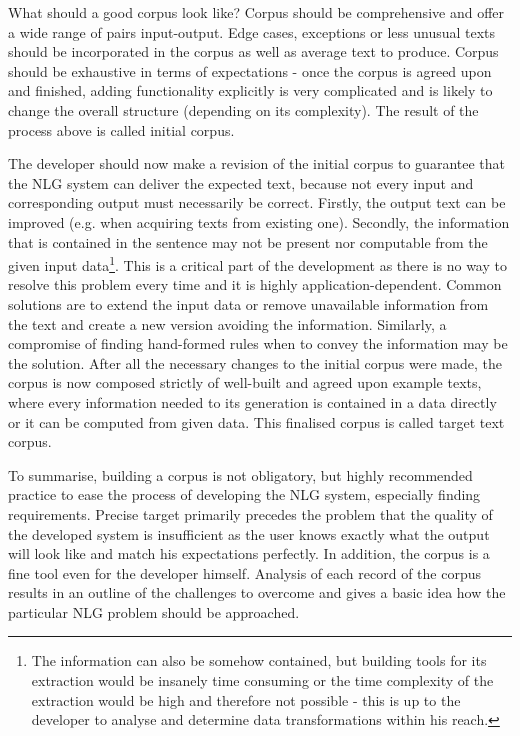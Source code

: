 What should a good corpus look like? Corpus should be comprehensive and offer a wide range of pairs input-output. Edge cases, exceptions or less unusual texts should be incorporated in the corpus as well as average text to produce. Corpus should be exhaustive in terms of expectations - once the corpus is agreed upon and finished, adding functionality explicitly is very complicated and is likely to change the overall structure (depending on its complexity). The result of the process above is called initial corpus.

The developer should now make a revision of the initial corpus to guarantee that the NLG system can deliver the expected text, because not every input and corresponding output must necessarily be correct. Firstly, the output text can be improved (e.g. when acquiring texts from existing one). Secondly, the information that is contained in the sentence may not be present nor computable from the given input data\footnote{The information can also be somehow contained, but building tools for its extraction would be insanely time consuming or the time complexity of the extraction would be high and therefore not possible - this is up to the developer to analyse and determine data transformations within his reach.}. This is a critical part of the development as there is no way to resolve this problem every time and it is highly application-dependent. Common solutions are to extend the input data or remove unavailable information from the text and create a new version avoiding the information. Similarly, a compromise of finding hand-formed rules when to convey the information may be the solution. After all the necessary changes to the initial corpus were made, the corpus is now composed strictly of well-built and agreed upon example texts, where every information needed to its generation is contained in a data directly or it can be computed from given data. This finalised corpus is called target text corpus.

To summarise, building a corpus is not obligatory, but highly recommended practice to ease the process of developing the NLG system, especially finding requirements. Precise target primarily precedes the problem that the quality of the developed system is insufficient as the user knows exactly what the output will look like and match his expectations perfectly. In addition, the corpus is a fine tool even for the developer himself. Analysis of each record of the corpus results in an outline of the challenges to overcome and gives a basic idea how the particular NLG problem should be approached.
